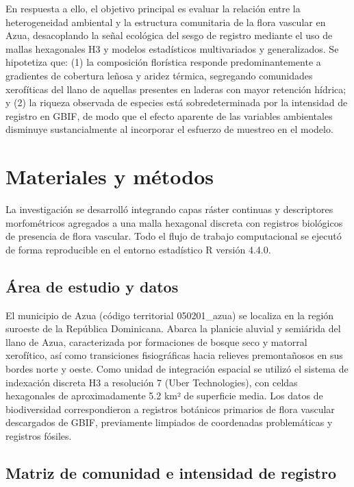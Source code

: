 \documentclass[
  12pt,
  man,
  floatsintext]{apa7}
\begin{document}
En respuesta a ello, el objetivo principal es evaluar la relación entre la heterogeneidad ambiental y la estructura comunitaria de la flora vascular en Azua, desacoplando la señal ecológica del sesgo de registro mediante el uso de mallas hexagonales H3 y modelos estadísticos multivariados y generalizados. Se hipotetiza que: (1) la composición florística responde predominantemente a gradientes de cobertura leñosa y aridez térmica, segregando comunidades xerofíticas del llano de aquellas presentes en laderas con mayor retención hídrica; y (2) la riqueza observada de especies está sobredeterminada por la intensidad de registro en GBIF, de modo que el efecto aparente de las variables ambientales disminuye sustancialmente al incorporar el esfuerzo de muestreo en el modelo.

\section{Materiales y métodos}\label{materiales-y-muxe9todos}

La investigación se desarrolló integrando capas ráster continuas y descriptores morfométricos agregados a una malla hexagonal discreta con registros biológicos de presencia de flora vascular. Todo el flujo de trabajo computacional se ejecutó de forma reproducible en el entorno estadístico R versión 4.4.0.

\subsection{Área de estudio y datos}\label{uxe1rea-de-estudio-y-datos}

El municipio de Azua (código territorial 050201\_azua) se localiza en la región suroeste de la República Dominicana. Abarca la planicie aluvial y semiárida del llano de Azua, caracterizada por formaciones de bosque seco y matorral xerofítico, así como transiciones fisiográficas hacia relieves premontañosos en sus bordes norte y oeste. Como unidad de integración espacial se utilizó el sistema de indexación discreta H3 a resolución 7 (Uber Technologies), con celdas hexagonales de aproximadamente 5.2 km² de superficie media. Los datos de biodiversidad correspondieron a registros botánicos primarios de flora vascular descargados de GBIF, previamente limpiados de coordenadas problemáticas y registros fósiles.

\subsection{Matriz de comunidad e intensidad de registro}\label{matriz-de-comunidad-e-intensidad-de-registro}
\end{document}
